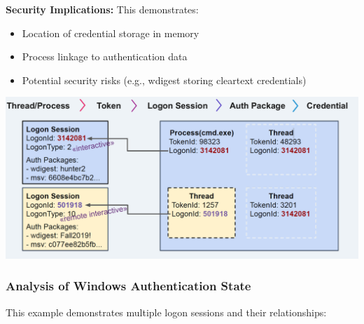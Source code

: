 \textbf{Security Implications:}
This demonstrates:
\begin{itemize}
   \item Location of credential storage in memory
   \item Process linkage to authentication data
   \item Potential security risks (e.g., wdigest storing cleartext credentials)
\end{itemize}


\includegraphics[width=\textwidth]{resources/11-logon-session-token-2.png}

\subsubsection*{Analysis of Windows Authentication State}

This example demonstrates multiple logon sessions and their relationships:

